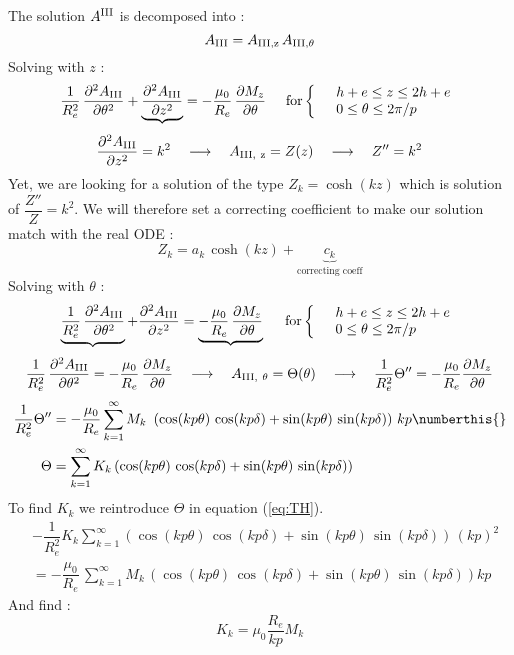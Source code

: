 The solution $A^{\rm III}$ is decomposed into :
$$A_{\rm III} = A_{\rm III, z}\, A_{\rm III, \theta}$$
Solving with $z$ :
$$\dfrac{1}{R_e^2}\, \dfrac{\partial^2 A_{\rm III}}{\partial \theta ^2}
+ \underbrace{ \dfrac{\partial^2 A_{\rm III}}{\partial z^2}}
= -\dfrac{\mu_0}{R_e}\, \dfrac{\partial M_z}{\partial \theta}
\hspace{.5cm} \text{for}
\left\{
\begin{array}{lll}
& h+e \leq z \leq 2h+e \\
& 0 \leq \theta \leq 2\pi/p
 \end{array}
\right. 
$$
$$ \dfrac{\partial^2 A_{\rm III}}{\partial z^2} = k^2 \quad \longrightarrow \quad A_{\rm III,\ z} = Z(z) \quad \longrightarrow \quad Z'' = k^2 $$
Yet, we are looking for a solution of the type $Z_k = \cosh (kz)$ which is solution of $\dfrac{Z''}{Z} = k^2$. We will therefore set a correcting coefficient to make our solution match with the real ODE :
$$Z_k = a_k\, \cosh(kz) + \underbrace{c_k}_{\text{correcting coeff}}$$
\noindent 
Solving with $\theta$ :
$$ \underbrace{\dfrac{1}{R_e^2}\, \dfrac{\partial^2 A_{\rm III}}{\partial \theta ^2}}
+ \dfrac{\partial^2 A_{\rm III}}{\partial z^2}
= \underbrace{-\dfrac{\mu_0}{R_e}\, \dfrac{\partial M_z}{\partial \theta}}
\hspace{.5cm} \text{for}
\left\{
\begin{array}{lll}
& h+e \leq z \leq 2h+e \\
& 0 \leq \theta \leq 2\pi/p
 \end{array}
\right. $$
$$ \dfrac{1}{R_e^2}\, \dfrac{\partial^2 A_{\rm III}}{\partial \theta ^2}
= -\dfrac{\mu_0}{R_e}\, \dfrac{\partial M_z}{\partial \theta} \quad \longrightarrow \quad A_{\rm III,\ \theta} = \Theta(\theta) \quad \longrightarrow \quad \dfrac{1}{R_e^2} \Theta'' = -\dfrac{\mu_0}{R_e} \dfrac{\partial M_z}{\partial \theta} $$
\begin{align*}
     \dfrac{1}{R_e^2} \Theta'' &= -\dfrac{\mu_0}{R_e} \sum\limits_{k=1}^{\infty}
M_k\ \left( \cos(kp\theta)\, \cos(kp\delta) + \sin(kp\theta)\, \sin(kp\delta) \right)\, kp  \numberthis{} \label{eq:TH}\\
 \Theta &= \sum\limits_{k=1}^{\infty} K_k \left( \cos(kp\theta)\, \cos(kp\delta) + \sin(kp\theta)\, \sin(kp\delta) \right)
\end{align*}
To find $K_k$ we reintroduce $\Theta$ in equation (\ref{eq:TH}).
\begin{align*}
& - \dfrac{1}{R_e^2} K_k \sum\limits_{k=1}^{\infty} \left( \cos(kp\theta)\, \cos(kp\delta) + \sin(kp\theta)\, \sin(kp\delta) \right)\, (kp)^2 \\
&= -\dfrac{\mu_0}{R_e}\, \sum\limits_{k=1}^{\infty} M_k\, \left( \cos(kp\theta)\, \cos(kp\delta) + \sin(kp\theta)\, \sin(kp\delta) \right) kp 
\end{align*}
And find : 
$$ K_k = \mu_0\dfrac{R_e}{kp}M_k$$

